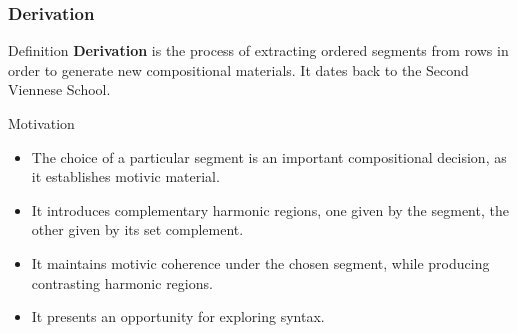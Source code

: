 
\begin{frame}
	\frametitle{Derivation}
	\begin{block}{Definition}
		\textbf{Derivation} is the process of extracting ordered segments from rows in order to generate new compositional materials. It dates back to the Second Viennese School.
	\end{block}
	\begin{block}{Motivation}
		\begin{itemize}
		\item The choice of a particular segment is an important compositional decision, as it establishes motivic material.
		\item It introduces complementary harmonic regions, one given by the segment, the other given by its set complement.
		\item It maintains motivic coherence under the chosen segment, while producing contrasting harmonic regions.
		\item It presents an opportunity for exploring syntax.
	\end{itemize}
	\end{block}
\end{frame}

